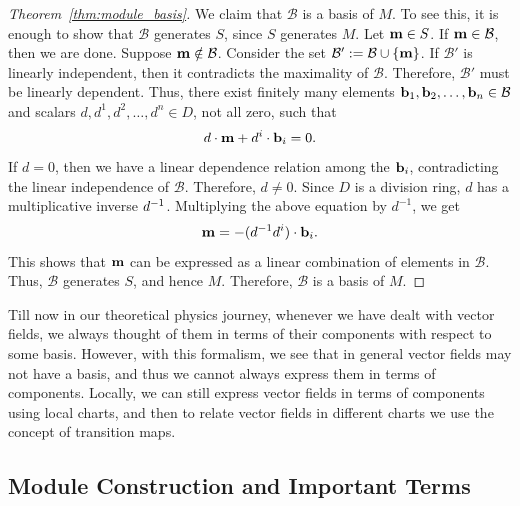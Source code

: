 \begin{proof}[Theorem~\ref{thm:module_basis}]
	We claim that \(\mathcal{B}\) is a basis of \(M\). To see this, it is enough to show that \(\mathcal{B}\) generates \(S\), since \(S\) generates \(M\). Let \(\vb{m} \in S\). If \(\vb{m} \in \mathcal{B}\), then we are done. Suppose \(\vb{m} \notin \mathcal{B}\). Consider the set \(\mathcal{B}' := \mathcal{B} \cup \{\vb{m}\}\). If \(\mathcal{B}'\) is linearly independent, then it contradicts the maximality of \(\mathcal{B}\). Therefore, \(\mathcal{B}'\) must be linearly dependent. Thus, there exist finitely many elements \(\vb{b}_1, \vb{b}_2, \ldots, \vb{b}_n \in \mathcal{B}\) and scalars \(d, d^1, d^2, \ldots, d^n \in D\), not all zero, such that
	\begin{equation}
		d \cdot \vb{m} + d^i \cdot \vb{b}_i = 0.
	\end{equation}
	If \(d = 0\), then we have a linear dependence relation among the \(\vb{b}_i\), contradicting the linear independence of \(\mathcal{B}\). Therefore, \(d \neq 0\). Since \(D\) is a division ring, \(d\) has a multiplicative inverse \(d^{-1}\). Multiplying the above equation by \(d^{-1}\), we get
	\begin{equation}
		\vb{m} = - (d^{-1} d^i) \cdot \vb{b}_i.
	\end{equation}
	This shows that \(\vb{m}\) can be expressed as a linear combination of elements in \(\mathcal{B}\). Thus, \(\mathcal{B}\) generates \(S\), and hence \(M\). Therefore, \(\mathcal{B}\) is a basis of \(M\).
\end{proof}
Till now in our theoretical physics journey, whenever we have dealt with vector fields, we always thought of them in terms of their components with respect to some basis. However, with this formalism, we see that in general vector fields may not have a basis, and thus we cannot always express them in terms of components. Locally, we can still express vector fields in terms of components using local charts, and then to relate vector fields in different charts we use the concept of transition maps.

\subsection{Module Construction and Important Terms}

